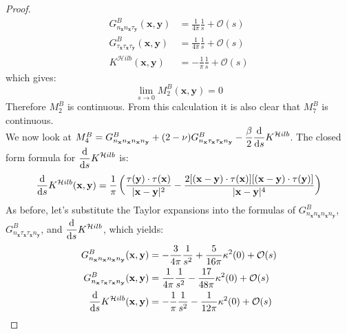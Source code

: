 \documentclass[preprint,12pt,3p]{elsarticle}
\newcommand{\dd}{ {\rm d} }
\begin{document}
\begin{proof}
    \begin{align}
        G^{B}_{n_\mathbf{x} n_\mathbf{x} \tau_\mathbf{y}} (\mathbf{x},\mathbf{y})  &= \frac{1}{4\pi} \frac{1}{s} + \mathcal{O}(s) \\
        G^{B}_{\tau_\mathbf{x} \tau_\mathbf{x} \tau_\mathbf{y}} (\mathbf{x},\mathbf{y}) &= \frac{1}{4\pi} \frac{1}{s} + \mathcal{O}(s) \\
        K^{\mathcal{H}ilb}(\mathbf{x}, \mathbf{y}) &= -\frac{1}{\pi} \frac{1}{s} + \mathcal{O}(s) \label{hilbexpansion}
    \end{align}
    which gives:
    \begin{equation}
        \lim_{s\to 0} M^B_2(\mathbf{x},\mathbf{y}) = 0
    \end{equation}
    Therefore $M_{2}^{B}$ is continuous. From this calculation it is also clear that $M_{7}^{B}$ is continuous. \\
    We now look at $M_{4}^{B} = G^{B}_{n_\mathbf{x} n_\mathbf{x} n_\mathbf{x} n_\mathbf{y}} + (2-\nu)G^{B}_{n_\mathbf{x} \tau_\mathbf{x}\tau_\mathbf{x} n_\mathbf{y}} - \displaystyle\frac{\beta}{2} \frac{\dd}{\dd s} K^{\mathcal{H}ilb}$. The closed form formula for $\displaystyle\frac{\dd}{\dd s}K^{\mathcal{H}ilb}$ is: 
    \begin{equation}
        \frac{\dd}{\dd s}K^{\mathcal{H}ilb}(\mathbf{x},\mathbf{y}) = \frac{1}{\pi}\left(\frac{ \tau(\mathbf{y})  \cdot \tau(\mathbf{x})}{|\mathbf{x}-\mathbf{y}|^2} - \frac{2 [(\mathbf{x}-\mathbf{y})\cdot \tau(\mathbf{x})][(\mathbf{x}-\mathbf{y}) \cdot  \tau(\mathbf{y}) ]}{|\mathbf{x}-\mathbf{y}|^4}\right)
    \end{equation}
    As before, let's substitute the Taylor expansions into the formulas of $G^{B}_{n_\mathbf{x} n_\mathbf{x} n_\mathbf{x} n_\mathbf{y}}$, $G^{B}_{n_\mathbf{x} \tau_\mathbf{x}\tau_\mathbf{x} n_\mathbf{y}}$, and $\displaystyle\frac{\dd}{\dd s}K^{\mathcal{H}ilb}$, which yields: 
    \begin{align}
        G^{B}_{n_\mathbf{x} n_\mathbf{x} n_\mathbf{x} n_\mathbf{y}}(\mathbf{x},\mathbf{y}) &= -\frac{3}{4\pi}\frac{1}{s^2} + \frac{5}{16\pi}\kappa^2(0) + \mathcal{O}(s)\\
        G^{B}_{n_\mathbf{x} \tau_\mathbf{x}\tau_\mathbf{x} n_\mathbf{y}} (\mathbf{x},\mathbf{y}) &= \frac{1}{4\pi} \frac{1}{s^2} - \frac{17}{48 \pi} \kappa^2(0) + \mathcal{O}(s)\\
        \frac{\dd}{\dd s}K^{\mathcal{H}ilb}(\mathbf{x},\mathbf{y}) &= -\frac{1}{\pi} \frac{1}{s^2}  - \frac{1}{12\pi}\kappa^2(0)+ \mathcal{O}(s)
    \end{align}

\end{proof}
\end{document}
